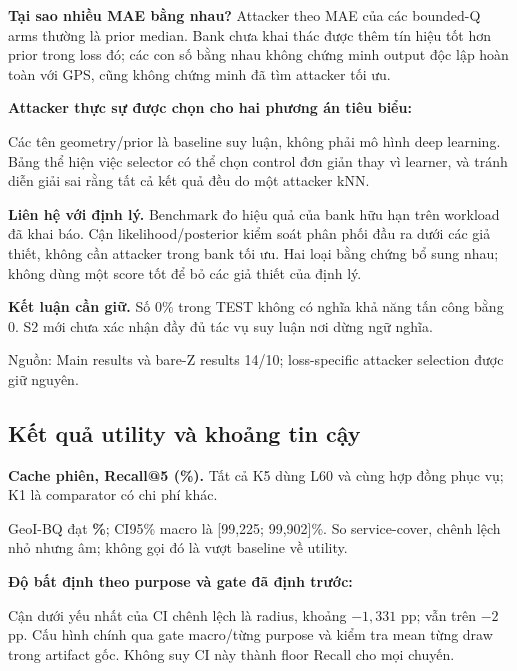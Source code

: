 \documentclass[10pt,a4paper]{article}
\newcommand{\source}[1]{\par{\footnotesize\color{gray}Nguồn: #1}\par}
\newcommand{\claim}[1]{\par\textbf{Kết luận cần giữ.} #1\par}
\begin{document}
\textbf{Tại sao nhiều MAE bằng nhau?} Attacker theo MAE của các bounded-Q arms thường là prior median.
Bank chưa khai thác được thêm tín hiệu tốt hơn prior trong loss đó; các con số bằng nhau không chứng minh
output độc lập hoàn toàn với GPS, cũng không chứng minh đã tìm attacker tối ưu.

\textbf{Attacker thực sự được chọn cho hai phương án tiêu biểu:}
\begin{small}\end{small}
Các tên geometry/prior là baseline suy luận, không phải mô hình deep learning. Bảng thể hiện việc selector
có thể chọn control đơn giản thay vì learner, và tránh diễn giải sai rằng tất cả kết quả đều do một attacker kNN.

\textbf{Liên hệ với định lý.} Benchmark đo hiệu quả của bank hữu hạn trên workload đã khai báo.
Cận likelihood/posterior kiểm soát phân phối đầu ra dưới các giả thiết, không cần attacker trong bank tối ưu.
Hai loại bằng chứng bổ sung nhau; không dùng một score tốt để bỏ các giả thiết của định lý.

\claim{Số 0\% trong TEST không có nghĩa khả năng tấn công bằng 0. S2 mới chưa xác nhận đầy đủ tác vụ suy luận nơi dừng ngữ nghĩa.}
\source{Main results và bare-Z results 14/10; loss-specific attacker selection được giữ nguyên.}

\clearpage
\subsection{Kết quả utility và khoảng tin cậy}
\textbf{Cache phiên, Recall@5 (\%).} Tất cả K5 dùng L60 và cùng hợp đồng phục vụ; K1 là comparator có chi phí khác.
\begin{small}\end{small}
GeoI-BQ đạt \textbf{\PrimaryRecall\%}; CI95\% macro là [99,225; 99,902]\%.
So service-cover, chênh lệch nhỏ nhưng âm; không gọi đó là vượt baseline về utility.

\textbf{Độ bất định theo purpose và gate đã định trước:}
\begin{small}\end{small}
Cận dưới yếu nhất của CI chênh lệch là radius, khoảng $-1{,}331$ pp; vẫn trên $-2$ pp.
Cấu hình chính qua gate macro/từng purpose và kiểm tra mean từng draw trong artifact gốc.
Không suy CI này thành floor Recall cho mọi chuyến.
\end{document}
